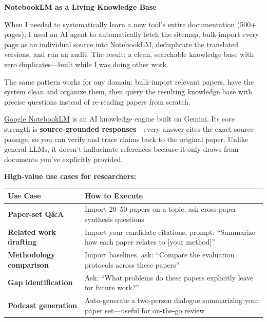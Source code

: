 \documentclass[11pt,a4paper]{article}
\begin{document}
\textbf{NotebookLM as a Living Knowledge Base}

\begin{tcolorbox}[colback=green!5,colframe=green!50,title={Personal Experience: From 524 URLs to 269 Clean Sources in One Session}]
When I needed to systematically learn a new tool's entire documentation (500+ pages), I used an AI agent to automatically fetch the sitemap, bulk-import every page as an individual source into NotebookLM, deduplicate the translated versions, and run an audit. The result: a clean, searchable knowledge base with zero duplicates---built while I was doing other work.

The same pattern works for any domain: bulk-import relevant papers, have the system clean and organize them, then query the resulting knowledge base with precise questions instead of re-reading papers from scratch.
\end{tcolorbox}

\href{https://notebooklm.google.com/}{Google NotebookLM} is an AI knowledge engine built on Gemini. Its core strength is \textbf{source-grounded responses}---every answer cites the exact source passage, so you can verify and trace claims back to the original paper. Unlike general LLMs, it doesn't hallucinate references because it only draws from documents you've explicitly provided.

\textbf{High-value use cases for researchers:}

\begin{table}[H]
\centering
\small
\begin{tabular}{@{}p{3.5cm}p{9cm}@{}}
\toprule
\textbf{Use Case} & \textbf{How to Execute} \\
\midrule
\textbf{Paper-set Q\&A} & Import 20--50 papers on a topic, ask cross-paper synthesis questions \\
\textbf{Related work drafting} & Import your candidate citations, prompt: ``Summarize how each paper relates to [your method]'' \\
\textbf{Methodology comparison} & Import baselines, ask: ``Compare the evaluation protocols across these papers'' \\
\textbf{Gap identification} & Ask: ``What problems do these papers explicitly leave for future work?'' \\
\textbf{Podcast generation} & Auto-generate a two-person dialogue summarizing your paper set---useful for on-the-go review \\

\bottomrule
\end{tabular}
\end{table}
\end{document}
